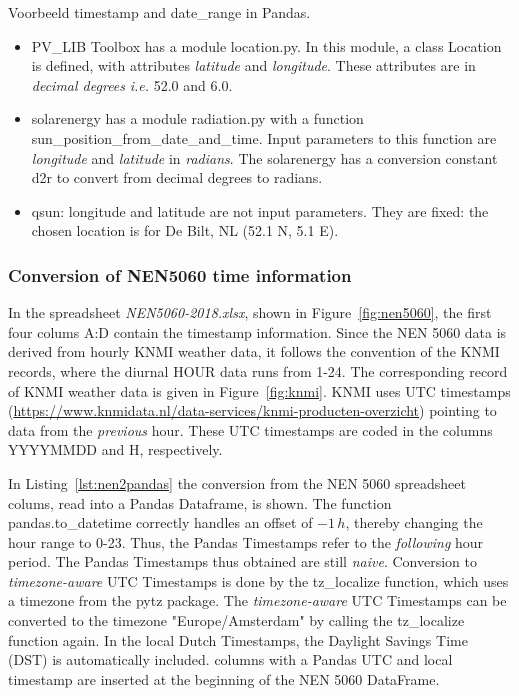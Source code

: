 Voorbeeld timestamp and date\_range in Pandas.

\begin{itemize}
	\item \textsf{PV\_LIB Toolbox} has a  module \textsf{location.py}. In this module, a class \textsf{Location} is defined, with attributes  \emph{latitude} and \emph{longitude}. These attributes are in \emph{decimal degrees} \textit{i.e.} 52.0 and 6.0. 
	\item \textsf{solarenergy} has a module \textsf{radiation.py} with  a function \textsf{sun\_position\_from\_date\_and\_time}. Input parameters to this function are \emph{longitude} and \emph{latitude} in \emph{radians}. The \textsf{solarenergy} has a conversion constant \textsf{d2r} to convert from decimal degrees to radians. 
	\item \textsf{qsun}: longitude and latitude are not input parameters. They are fixed: the chosen location is for De Bilt, NL (52.1 N, 5.1 E).
\end{itemize}

\subsubsection{Conversion of NEN5060 time information}

In the spreadsheet \emph{NEN5060-2018.xlsx}, shown in Figure~\ref{fig:nen5060}, the first four colums A:D contain the timestamp information. Since the NEN 5060 data is derived from hourly KNMI weather data, it follows the convention of the KNMI records, where the diurnal HOUR data runs from 1-24.  
The corresponding record of KNMI weather data is given in Figure~\ref{fig:knmi}. KNMI uses UTC timestamps (\url{https://www.knmidata.nl/data-services/knmi-producten-overzicht}) pointing to data from the \emph{previous} hour. These UTC timestamps are coded in the columns YYYYMMDD and H, respectively.

In Listing~\ref{lst:nen2pandas} the conversion from the NEN 5060 spreadsheet colums, read into a Pandas Dataframe, is shown. The function \textsf{pandas.to\_datetime} correctly handles an offset of $-1\, h$, thereby changing the hour range to 0-23. Thus, the Pandas Timestamps refer to the \emph{following} hour period.
The Pandas Timestamps thus obtained are still \emph{naive}. Conversion to \emph{timezone-aware} UTC Timestamps is done by the \textsf{tz\_localize} function, which uses a timezone from the \textsf{pytz} package. The \emph{timezone-aware} UTC Timestamps can be converted to the timezone "Europe/Amsterdam" by calling the \textsf{tz\_localize} function again. In the local Dutch Timestamps, the Daylight Savings Time (DST) is automatically included. columns with a Pandas UTC and local timestamp are inserted at the beginning of the NEN 5060 DataFrame.

